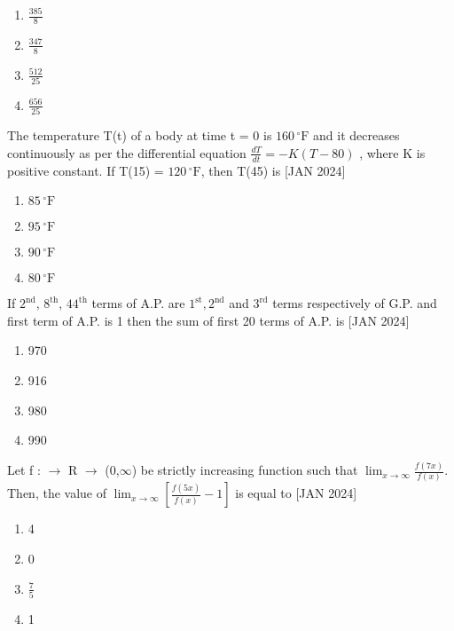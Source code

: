     \begin{multicols}{4}
    \begin{enumerate}
        \item $\frac{385}{8}$
        \item $\frac{347}{8}$
        \item $\frac{512}{25}$
        \item $\frac{656}{25}$
    \end{enumerate} 
    \end{multicols}
    \bigskip
    \item The temperature T(t) of a body at time t = 0 is $160\,^{\circ}\mathrm{F}$
    and it decreases continuously as per the differential equation $\frac{dT}{dt} = -K(T - 80)$ , where K is positive constant. If T(15) = $120\,^{\circ}\mathrm{F}$, then T(45) is \hfill{[JAN 2024]}
    \begin{enumerate}
        \item $85\,^{\circ}\mathrm{F}$
        \item $95\,^{\circ}\mathrm{F}$
        \item $90\,^{\circ}\mathrm{F}$
        \item $80\,^{\circ}\mathrm{F}$
    \end{enumerate}
    \bigskip
    \item If $2^{\text{nd}}$, $8^{\text{th}}$, $44^{\text{th}}$ terms of A.P. are $1^{\text{st}},2^{\text{nd}}$ and $3^{\text{rd}}$ terms respectively of G.P. and first term of A.P. is 1 then the sum of first 20 terms of A.P. is  \hfill{[JAN 2024]}
    \begin{multicols}{4}
    \begin{enumerate}
        \item 970
        \item 916
        \item 980
        \item 990
    \end{enumerate} 
    \end{multicols}
    \bigskip
    \item Let f : $\rightarrow$ R $\rightarrow$ (0,$\infty$)  be strictly increasing function such that $\lim_{x \to \infty} \frac{f(7x)}{f(x)}$. Then, the value of $\lim_{x \to \infty} \left[\frac{f(5x)}{f(x)} - 1\right]$ is equal to \hfill{[JAN 2024]}
    \begin{multicols}{4}
    \begin{enumerate}
        \item 4
        \item 0
        \item $\frac{7}{5}$
        \item 1
    \end{enumerate} 
    \end{multicols}
